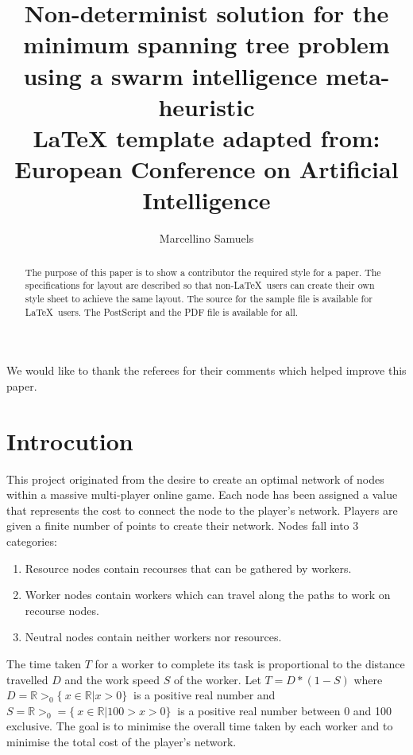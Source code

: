 \documentclass{AISB2008}
\begin{document}
\title{Non-determinist solution for the minimum spanning tree problem using a swarm intelligence meta-heuristic\\
	\small \LaTeX \hspace{1mm} template adapted from: \\
European Conference on Artificial Intelligence}

\author{Marcellino Samuels }

\maketitle


\begin{abstract}
The purpose of this paper is to show a contributor the required
style for a paper. The specifications
for layout are described so that non-\LaTeX\ users can create their
own style sheet to achieve the same layout. The source for the
sample file is available for \LaTeX\ users. The PostScript and the
PDF file is available for all.
\end{abstract}

\ack
We would like to thank the referees for their comments which helped improve
this paper.

\tableofcontents

\section{Introcution}
This project originated from the desire to create an optimal network of nodes within a massive multi-player online game. Each node has been assigned a value that represents the cost to connect the node to the player’s network. Players are given a finite number of points to create their network. Nodes fall into 3 categories:

\begin{enumerate}
\item Resource nodes contain recourses that can be gathered by workers.
\item Worker nodes contain workers which can travel along the paths to work on recourse nodes.
\item Neutral nodes contain neither workers nor resources.
\end {enumerate}

The time taken {$T$} for a worker to complete its task is proportional to the distance travelled {$D$} and the work speed {$S$} of the worker. Let {$T = D * (1 - S)$} where {$D = {\mathbb{R}}>_0 \{\ x \in {\mathbb{R} | x > 0\}\ }$} is a positive real number and {$S = {\mathbb{R}}>_0 = \{\ x \in {\mathbb{R}} | 100 > x > 0 \}\  $} is a positive real number between 0 and 100 exclusive. The goal is to minimise the overall time taken by each worker and to minimise the total cost of the player’s network.
\end{document}
